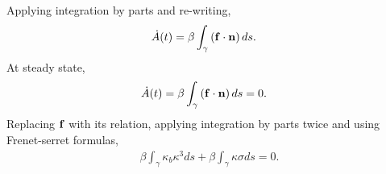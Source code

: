 \documentclass[twoside,twocolumn,9pt]{article}
\begin{document}
Applying integration by parts and re-writing,
\begin{align}
\dot{A}(t) &= \beta \int_{\gamma}\left(\mathbf{f}\cdot\mathbf{n}\right)ds.
\end{align}
At steady state,
\begin{align}
\dot{A}(t) &= \beta \int_{\gamma}\left(\mathbf{f}\cdot\mathbf{n}\right)ds =0.
\end{align}
Replacing $\mathbf{f}$ with its relation, applying integration by parts twice and using Frenet-serret formulas,  
\begin{align}
\beta\int_{\gamma}\kappa_b\kappa^3 ds +\beta\int_{\gamma} \kappa\sigma ds  = 0. 
\end{align} 

\end{document}
